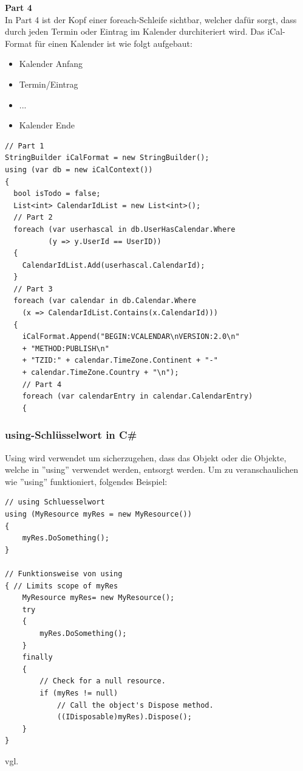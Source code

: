\textbf{Part 4} \\
In Part 4 ist der Kopf einer foreach-Schleife sichtbar, welcher dafür sorgt, dass durch jeden Termin oder Eintrag im Kalender durchiteriert wird. Das iCal-Format für einen Kalender ist wie folgt aufgebaut: 
\begin{itemize}
\item Kalender Anfang
\item Termin/Eintrag
\item ...
\item Kalender Ende
\end{itemize}

\begin{lstlisting}[caption=Parser Verbindung zur DB mit dem Entity Framework, label=lst:test]
// Part 1
StringBuilder iCalFormat = new StringBuilder();
using (var db = new iCalContext())
{
  bool isTodo = false;
  List<int> CalendarIdList = new List<int>();
  // Part 2
  foreach (var userhascal in db.UserHasCalendar.Where
  		  (y => y.UserId == UserID))
  {
	CalendarIdList.Add(userhascal.CalendarId);
  }
  // Part 3
  foreach (var calendar in db.Calendar.Where
  	(x => CalendarIdList.Contains(x.CalendarId)))
  {
    iCalFormat.Append("BEGIN:VCALENDAR\nVERSION:2.0\n"
	+ "METHOD:PUBLISH\n"
	+ "TZID:" + calendar.TimeZone.Continent + "-" 
	+ calendar.TimeZone.Country + "\n");
    // Part 4
    foreach (var calendarEntry in calendar.CalendarEntry)
    {
\end{lstlisting} 
\subsubsection{using-Schlüsselwort in C\#}
\label{usingkeyword}
Using wird verwendet um sicherzugehen, dass das Objekt oder die Objekte, welche in ''using'' verwendet werden, entsorgt werden. Um zu veranschaulichen wie ''using'' funktioniert, folgendes Beispiel:

\begin{lstlisting}[caption=Parser funktionsweise von using, label=lst:test]
// using Schluesselwort
using (MyResource myRes = new MyResource())
{
    myRes.DoSomething();
}
 
// Funktionsweise von using 
{ // Limits scope of myRes
    MyResource myRes= new MyResource();
    try
    {
        myRes.DoSomething();
    }
    finally
    {
        // Check for a null resource.
        if (myRes != null)
            // Call the object's Dispose method.
            ((IDisposable)myRes).Dispose();
    }
}
\end{lstlisting} 
vgl. \textcite{ParserUsingKeyword}
